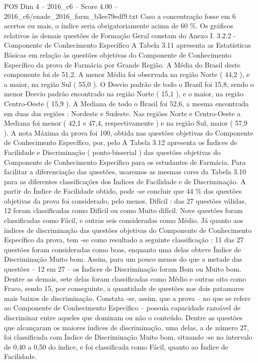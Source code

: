 \begin{textsample}{POS Dim 4 – 2016\_c6 – Score 4.00 – 2016\_c6/enade\_2016\_farm\_b3ee79edf9.txt}
Caso a concentração fosse em 6 acertos ou mais, o índice seria obrigatoriamente acima de 60 \%.
Os gráficos relativos às demais questões de Formação Geral constam do Anexo I. 3.2.2 - Componente de Conhecimento Específico A Tabela 3.11 apresenta as Estatísticas Básicas em relação às questões objetivas do Componente de Conhecimento Específico da prova de Farmácia por Grande Região.
A Média do Brasil deste componente foi de 51,2.
A menor Média foi observada na região Norte ( 44,2 ), e a maior, na região Sul ( 55,0 ).
O Desvio padrão de todo o Brasil foi 15,8, sendo o menor Desvio padrão encontrado na região Norte ( 15,1 ), e o maior, na região Centro-Oeste ( 15,9 ).
A Mediana de todo o Brasil foi 52,6, a mesma encontrada em duas das regiões : Nordeste e Sudeste.
Nas regiões Norte e Centro-Oeste a Mediana foi menor ( 42,1 e 47,4, respectivamente ) e na região Sul, maior ( 57,9 ).
A nota Máxima da prova foi 100, obtida nas questões objetivas do Componente de Conhecimento Específico, por, pelo A Tabela 3.12 apresenta os Índices de Facilidade e Discriminação ( ponto-bisserial ) das questões objetivas do Componente de Conhecimento Específico para os estudantes de Farmácia.
Para facilitar a diferenciação das questões, usaremos as mesmas cores da Tabela 3.10 para as diferentes classificações dos Índices de Facilidade e de Discriminação.
A partir do Índice de Facilidade obtido, pode -se concluir que 44 \% das questões objetivas da prova foi considerado, pelo menos, Difícil : das 27 questões válidas, 12 foram classificadas como Difícil ou como Muito difícil.
Nove questões foram classificadas como Fácil, e outras seis consideradas como Médio.
Já quanto aos índices de discriminação das questões objetivas do Componente de Conhecimento Específico da prova, tem -se como resultado a seguinte classificação : 11 das 27 questões foram consideradas como boas, enquanto uma delas obteve Índice de Discriminação Muito bom.
Assim, para um pouco menos do que a metade das questões – 12 em 27 – os Índices de Discriminação foram Bom ou Muito bom.
Dentre as demais, sete delas foram classificadas como Médio e outras oito como Fraco, sendo 15, por conseguinte, a quantidade de questões nos dois patamares mais baixos de discriminação.
Constata -se, assim, que a prova – no que se refere ao Componente de Conhecimento Específico – possuía capacidade razoável de discriminar entre aqueles que dominam ou não o conteúdo.
Dentre as questões que alcançaram os maiores índices de discriminação, uma delas, a de número 27, foi classificada com Índice de Discriminação Muito bom, situando -se no intervalo de 0,40 a 0,50 do índice, e foi classificada como Fácil, quanto ao Índice de Facilidade.

\end{textsample}
